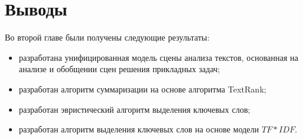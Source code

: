 \section{Выводы}

Во второй главе были получены следующие результаты:
\begin{itemize}
\item разработана унифицированная модель сцены анализа текстов, основанная на анализе и обобщении сцен решения прикладных задач;
\item разработан алгоритм суммаризации на основе алгоритма TextRank;
\item разработан эвристический алгоритм выделения ключевых слов;
\item разработан алгоритм выделения ключевых слов на основе модели $TF*IDF$.
\end{itemize}
\newpage
